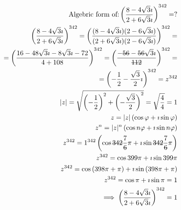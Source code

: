 \documentclass{article}
\newcommand{\stkout}[1]{\ifmmode\text{\sout{\ensuremath{#1}}}\else\sout{#1}\fi}
\begin{document}
    \begin{align*}
        \text{Algebric form of:} \left(\frac{8 - 4\sqrt3\imath}{2 + 6\sqrt3\imath}\right)^{342} = ?\\
        \left(\frac{8 - 4\sqrt3\imath}{2 + 6\sqrt3\imath}\right)^{342} =
        \left(\frac{(8 - 4\sqrt3\imath)(2 - 6\sqrt3\imath)}{(2 + 6\sqrt3\imath)(2 - 6\sqrt3\imath)}\right)^{342} =\\
        = \left(\frac{16 - 48\sqrt3\imath - 8\sqrt3\imath - 72}{4 + 108}\right)^{342}
        = \left(\frac{-\stkout{56} - \stkout{56}\sqrt3\imath}{\stkout{112}}\right)^{342} =\\
        = \left(-\frac{1}{2} -\frac{\sqrt3}{2}\imath\right)^{342} = z ^ {342}\\
        |z| = \sqrt{\left(-\frac{1}{2}\right) ^ 2 + \left(-\frac{\sqrt3}{2}\right) ^ 2} = \sqrt{\frac{4}{4}} = 1\\
        z  = |z|\left(\cos\varphi + \imath\sin\varphi\right)\\
        z ^ n  = |z| ^ n\left(\cos{n\varphi} + \imath\sin{n\varphi}\right)\\
        z ^ {342} = 1 ^ {342}\left(\cos{\stkout{342}\frac{7}{\stkout{6}}\pi} + \imath\sin{\stkout{342}\frac{7}{\stkout{6}}\pi}\right)\\
        z ^ {342} = \cos{399\pi} + \imath\sin{399\pi}\\
        z ^ {342} = \cos{(398\pi + \pi)} + \imath\sin{(398\pi + \pi)}\\
        z ^ {342} = \cos{\pi} + \imath\sin{\pi} = 1\\
        \implies \left(\frac{8 - 4\sqrt3\imath}{2 + 6\sqrt3\imath}\right)^{342} = 1
    \end{align*}
\end{document}
